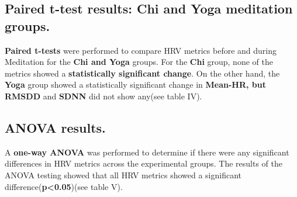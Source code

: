 \documentclass[
  11pt,
]{ieee}
\begin{document}
\subsection{Paired t-test results: Chi and Yoga meditation
groups.}\label{paired-t-test-results-chi-and-yoga-meditation-groups.}

\vspace{0.8em}

\textbf{Paired t-tests} were performed to compare HRV metrics before and
during Meditation for the \textbf{Chi and Yoga} groups. For the
\textbf{Chi} group, none of the metrics showed a \textbf{statistically
significant change}. On the other hand, the \textbf{Yoga} group showed a
statistically significant change in \textbf{Mean-HR, but RMSDD} and
\textbf{SDNN} did not show any(see table IV).

\begin{table}[!h]
\centering
\caption{T-Test results for Chi and Yoga}
\centering
{}
\end{table}

\subsection{ANOVA results.}\label{anova-results.}

\vspace{0.8em}

A \textbf{one-way ANOVA} was performed to determine if there were any
significant differences in HRV metrics across the experimental groups.
The results of the ANOVA testing showed that all HRV metrics showed a
significant difference(\textbf{p\textless0.05})(see table V).

\begin{table}[!h]
\centering
\caption{ANOVA results}
\centering
{}
\end{table}
\end{document}
